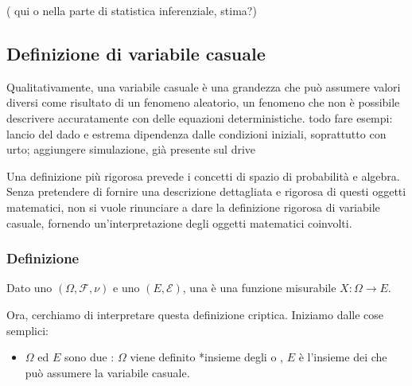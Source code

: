 \documentclass[letterpaper,10pt,italian]{jupyterBook}
\begin{document}
\sphinxAtStartPar
{\hyperref[\detokenize{ch/statistics::doc}]{}} ( qui o nella parte di statistica inferenziale, stima?)

\sphinxstepscope


\subsection{Definizione di variabile casuale}
\label{\detokenize{ch/statistics/random_variables_definition:definizione-di-variabile-casuale}}\label{\detokenize{ch/statistics/random_variables_definition:statistics-hs-random-variables-def}}\label{\detokenize{ch/statistics/random_variables_definition::doc}}
\sphinxAtStartPar
Qualitativamente, una variabile casuale è una grandezza che può assumere valori diversi come risultato di un fenomeno aleatorio, un fenomeno che non è possibile descrivere accuratamente con delle equazioni deterministiche. todo fare esempi: lancio del dado e estrema dipendenza dalle condizioni iniziali, soprattutto con urto; aggiungere simulazione, già presente sul drive

\sphinxAtStartPar
Una definizione più rigorosa prevede i concetti di spazio di probabilità e
\sphinxhyphen{}algebra. Senza pretendere di fornire una descrizione dettagliata e rigorosa di questi oggetti matematici, non si vuole rinunciare a dare la definizione rigorosa di variabile casuale, fornendo un’interpretazione degli oggetti matematici coinvolti.


\subsubsection{Definizione}
\label{\detokenize{ch/statistics/random_variables_definition:definizione}}
\sphinxAtStartPar
Dato uno  \((\Omega, \mathcal{F}, \nu)\) e uno  \((E, \mathcal{E})\), una  è una funzione misurabile \(X: \Omega \rightarrow E\).

\sphinxAtStartPar
Ora, cerchiamo di interpretare questa definizione criptica. Iniziamo dalle cose semplici:
\begin{itemize}
\item {} 
\sphinxAtStartPar
\(\Omega\) ed \(E\) sono due : \(\Omega\) viene definito *insieme degli  o , \(E\) è l’insieme dei  che può assumere la variabile casuale.

\end{itemize}
\end{document}
